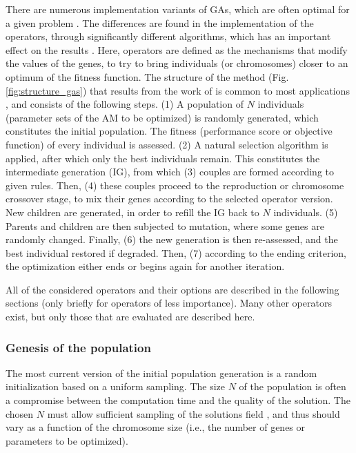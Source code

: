 \documentclass{ametsoc}
\begin{document}
There are numerous implementation variants of GAs, which are often optimal for a given problem \citep{Hart1991a, Schraudolph1992a}. The differences are found in the implementation of the operators, through significantly different algorithms, which has an important effect on the results \citep{Gaffney2010a}. Here, operators are defined as the mechanisms that modify the values of the genes, to try to bring individuals (or chromosomes) closer to an optimum of the fitness function. The structure of the method (Fig. \ref{fig:structure_gas}) that results from the work of \citet{Holland1992b} is common to most applications \citep{Back1993b}, and consists of the following steps. (1) A population of $N$ individuals (parameter sets of the AM to be optimized) is randomly generated, which constitutes the initial population. The fitness (performance score or objective function) of every individual is assessed. (2) A natural selection algorithm is applied, after which only the best individuals remain. This constitutes the intermediate generation (IG), from which (3) couples are formed according to given rules. Then, (4) these couples proceed to the reproduction or chromosome crossover stage, to mix their genes according to the selected operator version. New children are generated, in order to refill the IG back to $N$ individuals. (5) Parents and children are then subjected to mutation, where some genes are randomly changed. Finally, (6) the new generation is then re-assessed, and the best individual restored if degraded. Then, (7) according to the ending criterion, the optimization either ends or begins again for another iteration.


All of the considered operators and their options are described in the following sections (only briefly for operators of less importance). Many other operators exist, but only those that are evaluated are described here.

\subsubsection{Genesis of the population}

The most current version of the initial population generation is a random initialization based on a uniform sampling. The size $N$ of the population is often a compromise between the computation time and the quality of the solution. The chosen $N$ must allow sufficient sampling of the solutions field \citep{Beasley1996a}, and thus should vary as a function of the chromosome size (i.e., the number of genes or parameters to be optimized). 
\end{document}
